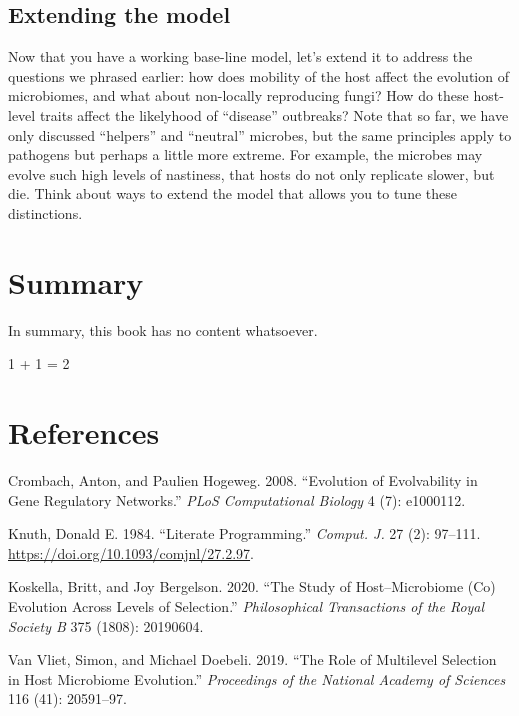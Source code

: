 \documentclass[
  letterpaper,
  DIV=11,
  numbers=noendperiod]{scrreprt}
\newenvironment{Shaded}{\begin{snugshade}}{\end{snugshade}}
\newcommand{\DecValTok}[1]{\textcolor[rgb]{0.68,0.00,0.00}{#1}}
\newcommand{\OperatorTok}[1]{\textcolor[rgb]{0.37,0.37,0.37}{#1}}
\newlength{\cslhangindent}
\newenvironment{CSLReferences}[2] %
 {\begin{list}{}{%
  \setlength{\itemindent}{0pt}
  \setlength{\leftmargin}{0pt}
  \setlength{\parsep}{0pt}
  \ifodd #1
   \setlength{\leftmargin}{\cslhangindent}
   \setlength{\itemindent}{-1\cslhangindent}
  \fi
  \setlength{\itemsep}{#2\baselineskip}}}
 {\end{list}}
\theoremstyle{definition}
\theoremstyle{remark}
\begin{document}
\section{Extending the model}\label{extending-the-model}

Now that you have a working base-line model, let's extend it to address
the questions we phrased earlier: how does mobility of the host affect
the evolution of microbiomes, and what about non-locally reproducing
fungi? How do these host-level traits affect the likelyhood of
``disease'' outbreaks? Note that so far, we have only discussed
``helpers'' and ``neutral'' microbes, but the same principles apply to
pathogens but perhaps a little more extreme. For example, the microbes
may evolve such high levels of nastiness, that hosts do not only
replicate slower, but die. Think about ways to extend the model that
allows you to tune these distinctions.


\chapter{Summary}\label{summary}

In summary, this book has no content whatsoever.

\begin{Shaded}
\begin{Highlighting}[]
\DecValTok{1} \OperatorTok{+} \DecValTok{1} \OperatorTok{=} \DecValTok{2}
\end{Highlighting}
\end{Shaded}


\chapter*{References}\label{references-12}


\label{refs}
\begin{CSLReferences}{1}{0}
Crombach, Anton, and Paulien Hogeweg. 2008. {``Evolution of Evolvability
in Gene Regulatory Networks.''} \emph{PLoS Computational Biology} 4 (7):
e1000112.

Knuth, Donald E. 1984. {``Literate Programming.''} \emph{Comput. J.} 27
(2): 97--111. \url{https://doi.org/10.1093/comjnl/27.2.97}.

Koskella, Britt, and Joy Bergelson. 2020. {``The Study of
Host--Microbiome (Co) Evolution Across Levels of Selection.''}
\emph{Philosophical Transactions of the Royal Society B} 375 (1808):
20190604.

Van Vliet, Simon, and Michael Doebeli. 2019. {``The Role of Multilevel
Selection in Host Microbiome Evolution.''} \emph{Proceedings of the
National Academy of Sciences} 116 (41): 20591--97.

\end{CSLReferences}
\end{document}
